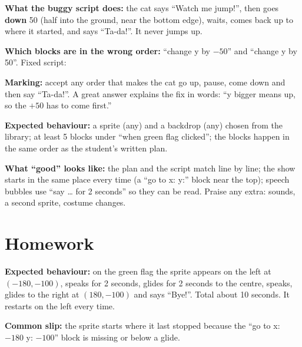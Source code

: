 \begin{answer}
\textbf{What the buggy script does:} the cat says \enquote{Watch me jump!}, then goes \textbf{down} 50 (half into the ground, near the bottom edge), waits, comes back up to where it started, and says \enquote{Ta-da!}. It never jumps up.

\textbf{Which blocks are in the wrong order:} \enquote{change y by $-50$} and \enquote{change y by 50}. Fixed script:
\begin{center}
\begin{scratch}[scale=0.85]
\end{scratch}
\end{center}
\textbf{Marking:} accept any order that makes the cat go up, pause, come down and then say \enquote{Ta-da!}. A great answer explains the fix in words: \enquote{y bigger means up, so the $+50$ has to come first.}
\end{answer}

\begin{answer}
\textbf{Expected behaviour:} a sprite (any) and a backdrop (any) chosen from the library; at least 5 blocks under \enquote{when green flag clicked}; the blocks happen in the same order as the student's written plan.

\textbf{What \enquote{good} looks like:} the plan and the script match line by line; the show starts in the same place every time (a \enquote{go to x: y:} block near the top); speech bubbles use \enquote{say \ldots{} for 2 seconds} so they can be read. Praise any extra: sounds, a second sprite, costume changes.
\end{answer}

\section{Homework}
\begin{answer}
\textbf{Expected behaviour:} on the green flag the sprite appears on the left at $(-180, -100)$, speaks for 2 seconds, glides for 2 seconds to the centre, speaks, glides to the right at $(180, -100)$ and says \enquote{Bye!}. Total about 10 seconds. It restarts on the left every time.

\textbf{Common slip:} the sprite starts where it last stopped because the \enquote{go to x: $-180$ y: $-100$} block is missing or below a glide.
\end{answer}

